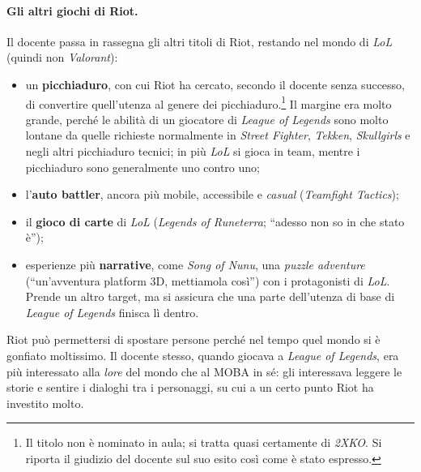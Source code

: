 \paragraph{Gli altri giochi di Riot.} Il docente passa in rassegna gli altri
titoli di Riot, restando nel mondo di \emph{LoL} (quindi non
\emph{Valorant}):
\begin{itemize}
  \item un \textbf{picchiaduro}, con cui Riot ha cercato, secondo il docente
        senza successo, di convertire quell'utenza al genere dei
        picchiaduro.\footnote{Il titolo non è nominato in aula; si tratta
        quasi certamente di \emph{2XKO}. Si riporta il giudizio del docente
        sul suo esito così come è stato espresso.} Il margine era molto
        grande, perché le abilità di un giocatore di \emph{League of Legends}
        sono molto lontane da quelle richieste normalmente in \emph{Street
        Fighter}, \emph{Tekken}, \emph{Skullgirls} e negli altri picchiaduro
        tecnici; in più \emph{LoL} si gioca in team, mentre i picchiaduro
        sono generalmente uno contro uno;
  \item l'\textbf{auto battler}, ancora più mobile, accessibile e
        \emph{casual} (\emph{Teamfight Tactics});
  \item il \textbf{gioco di carte} di \emph{LoL} (\emph{Legends of
        Runeterra}; ``adesso non so in che stato è'');
  \item esperienze più \textbf{narrative}, come \emph{Song of Nunu}, una
        \emph{puzzle adventure} (``un'avventura platform 3D, mettiamola
        così'') con i protagonisti di \emph{LoL}. Prende un altro target, ma
        si assicura che una parte dell'utenza di base di \emph{League of
        Legends} finisca lì dentro.
\end{itemize}
Riot può permettersi di spostare persone perché nel tempo quel mondo si è
gonfiato moltissimo. Il docente stesso, quando giocava a \emph{League of
Legends}, era più interessato alla \emph{lore} del mondo che al MOBA in sé:
gli interessava leggere le storie e sentire i dialoghi tra i personaggi, su
cui a un certo punto Riot ha investito molto.

